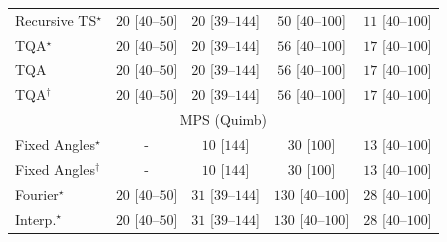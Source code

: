 \begin{tabular}{l|cccc|}
Recursive TS$^\star$ & {\cellcolor[HTML]{F5FBF2}} \color[HTML]{000000} $20$ [$40$--$50$] & {\cellcolor[HTML]{F5FBF2}} \color[HTML]{000000} $20$ [$39$--$144$] & {\cellcolor[HTML]{F0F9EC}} \color[HTML]{000000} $50$ [$40$--$100$] & {\cellcolor[HTML]{F6FCF4}} \color[HTML]{000000} $11$ [$40$--$100$] \\
TQA$^\star$ & {\cellcolor[HTML]{F5FBF2}} \color[HTML]{000000} $20$ [$40$--$50$] & {\cellcolor[HTML]{F5FBF2}} \color[HTML]{000000} $20$ [$39$--$144$] & {\cellcolor[HTML]{EFF9EB}} \color[HTML]{000000} $56$ [$40$--$100$] & {\cellcolor[HTML]{F5FBF3}} \color[HTML]{000000} $17$ [$40$--$100$] \\
TQA & {\cellcolor[HTML]{F5FBF2}} \color[HTML]{000000} $20$ [$40$--$50$] & {\cellcolor[HTML]{F5FBF2}} \color[HTML]{000000} $20$ [$39$--$144$] & {\cellcolor[HTML]{EFF9EB}} \color[HTML]{000000} $56$ [$40$--$100$] & {\cellcolor[HTML]{F5FBF3}} \color[HTML]{000000} $17$ [$40$--$100$] \\
TQA$^\dagger$ & {\cellcolor[HTML]{F5FBF2}} \color[HTML]{000000} $20$ [$40$--$50$] & {\cellcolor[HTML]{F5FBF2}} \color[HTML]{000000} $20$ [$39$--$144$] & {\cellcolor[HTML]{EFF9EB}} \color[HTML]{000000} $56$ [$40$--$100$] & {\cellcolor[HTML]{F5FBF3}} \color[HTML]{000000} $17$ [$40$--$100$] \\
\cline{1-5}
\multicolumn{5}{c}{\rule{0pt}{8pt}MPS (Quimb)} \\
\midrule
Fixed Angles$^\star$ & {\cellcolor[HTML]{000000}} \color[HTML]{F1F1F1} {\cellcolor{white}} \color{black} - & {\cellcolor[HTML]{F7FCF5}} \color[HTML]{000000} $10$ [$144$] & {\cellcolor[HTML]{F3FAF0}} \color[HTML]{000000} $30$ [$100$] & {\cellcolor[HTML]{F6FCF4}} \color[HTML]{000000} $13$ [$40$--$100$] \\
Fixed Angles$^\dagger$ & {\cellcolor[HTML]{000000}} \color[HTML]{F1F1F1} {\cellcolor{white}} \color{black} - & {\cellcolor[HTML]{F7FCF5}} \color[HTML]{000000} $10$ [$144$] & {\cellcolor[HTML]{F3FAF0}} \color[HTML]{000000} $30$ [$100$] & {\cellcolor[HTML]{F6FCF4}} \color[HTML]{000000} $13$ [$40$--$100$] \\
Fourier$^\star$ & {\cellcolor[HTML]{F5FBF2}} \color[HTML]{000000} $20$ [$40$--$50$] & {\cellcolor[HTML]{F3FAF0}} \color[HTML]{000000} $31$ [$39$--$144$] & {\cellcolor[HTML]{DFF3DA}} \color[HTML]{000000} $130$ [$40$--$100$] & {\cellcolor[HTML]{F4FBF1}} \color[HTML]{000000} $28$ [$40$--$100$] \\
Interp.$^\star$ & {\cellcolor[HTML]{F5FBF2}} \color[HTML]{000000} $20$ [$40$--$50$] & {\cellcolor[HTML]{F3FAF0}} \color[HTML]{000000} $31$ [$39$--$144$] & {\cellcolor[HTML]{DFF3DA}} \color[HTML]{000000} $130$ [$40$--$100$] & {\cellcolor[HTML]{F4FBF1}} \color[HTML]{000000} $28$ [$40$--$100$] \\

\end{tabular}
